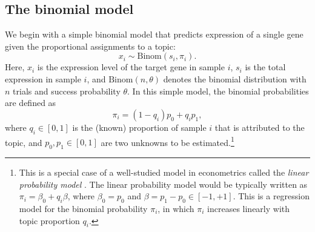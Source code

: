 \documentclass[final]{siamart171218}
\begin{document}
\subsection{The binomial model}

We begin with a simple binomial model that predicts expression of a
single gene given the proportional assignments to a topic:
\begin{equation}
x_i \sim \mathrm{Binom}(s_i, \pi_i).
\label{eq:binomial}
\end{equation}
Here, $x_i$ is the expression level of the target gene in sample $i$,
$s_i$ is the total expression in sample $i$, and $\mathrm{Binom}(n,
\theta)$ denotes the binomial distribution with $n$ trials and success
probability $\theta$. In this simple model, the binomial probabilities
are defined as
\begin{equation}
\pi_i = (1 - q_i) p_0 + q_i p_1,
\label{eq:binomial-prob}
\end{equation}
where $q_i \in [0,1]$ is the (known) proportion of sample $i$ that is
attributed to the topic, and $p_0, p_1 \in [0, 1]$ are two unknowns to
be estimated.\footnote{This is a special case of a well-studied model
  in econometrics called the {\em linear probability model}
  \cite{stock-watson}. The linear probability model would be typically
  written as $\pi_i = \beta_0 + q_i \beta$, where $\beta_0 = p_0$ and
  $\beta = p_1 - p_0 \in [-1, +1]$. This is a regression model for the
  binomial probability $\pi_i$, in which $\pi_i$ increases linearly
  with topic proportion $q_i$.}
\end{document}
